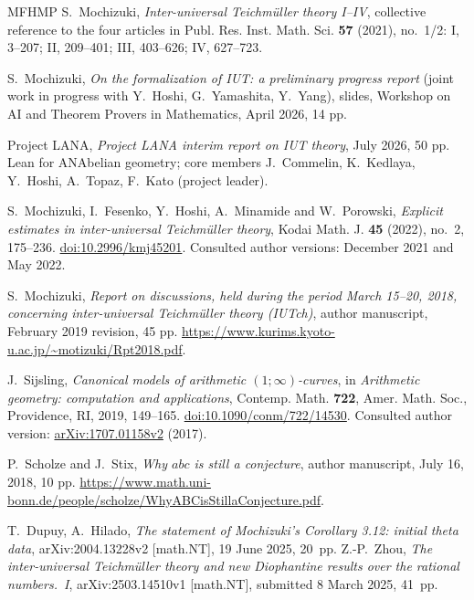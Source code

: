 \documentclass[11pt]{article}
\theoremstyle{plain}
\theoremstyle{definition}
\begin{document}
\begin{thebibliography}{MFHMP}
S.~Mochizuki,
\emph{Inter-universal Teichm\"uller theory I--IV},
collective reference to the four articles in
Publ. Res. Inst. Math. Sci. \textbf{57} (2021), no.~1/2:
I, 3--207; II, 209--401; III, 403--626; IV, 627--723.

S.~Mochizuki,
\emph{On the formalization of IUT: a preliminary progress report}
(joint work in progress with Y.~Hoshi, G.~Yamashita, Y.~Yang),
slides, Workshop on AI and Theorem Provers in Mathematics, April 2026, 14 pp.

Project LANA,
\emph{Project LANA interim report on IUT theory}, July 2026, 50 pp.
Lean for ANAbelian geometry; core members J.~Commelin, K.~Kedlaya, Y.~Hoshi,
A.~Topaz, F.~Kato (project leader).

S.~Mochizuki, I.~Fesenko, Y.~Hoshi, A.~Minamide and W.~Porowski,
\emph{Explicit estimates in inter-universal Teichm\"uller theory},
Kodai Math. J. \textbf{45} (2022), no.~2, 175--236.
\href{https://doi.org/10.2996/kmj45201}{doi:10.2996/kmj45201}.
Consulted author versions: December 2021 and May 2022.

S.~Mochizuki,
\emph{Report on discussions, held during the period March 15--20, 2018,
concerning inter-universal Teichm\"uller theory (IUTch)},
author manuscript, February 2019 revision, 45 pp.
\url{https://www.kurims.kyoto-u.ac.jp/~motizuki/Rpt2018.pdf}.

J.~Sijsling,
\emph{Canonical models of arithmetic $(1;\infty)$-curves},
in \emph{Arithmetic geometry: computation and applications},
Contemp. Math. \textbf{722}, Amer. Math. Soc., Providence, RI, 2019, 149--165.
\href{https://doi.org/10.1090/conm/722/14530}{doi:10.1090/conm/722/14530}.
Consulted author version: \href{https://arxiv.org/abs/1707.01158v2}{arXiv:1707.01158v2} (2017).

P.~Scholze and J.~Stix,
\emph{Why $abc$ is still a conjecture},
author manuscript, July 16, 2018, 10 pp.
\url{https://www.math.uni-bonn.de/people/scholze/WhyABCisStillaConjecture.pdf}.

 T.~Dupuy, A.~Hilado,
\emph{The statement of Mochizuki's Corollary 3.12: initial theta data},
arXiv:2004.13228v2 [math.NT], 19 June 2025, 20~pp.
 Z.-P.~Zhou,
\emph{The inter-universal Teichm\"uller theory and new Diophantine
results over the rational numbers.~I},
arXiv:2503.14510v1 [math.NT], submitted 8 March 2025, 41~pp.
\end{thebibliography}
\end{document}
